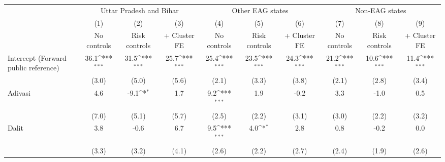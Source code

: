 {
\def\sym#1{\ifmmode^{#1}\else\(^{#1}\)\fi}
\begin{tabular}{l*{9}{c}}
\toprule
            &\multicolumn{3}{c}{Uttar Pradesh and Bihar}                      &\multicolumn{3}{c}{Other EAG states}                             &\multicolumn{3}{c}{Non-EAG states}                               \\\cmidrule(lr){2-4}\cmidrule(lr){5-7}\cmidrule(lr){8-10}
            &\multicolumn{1}{c}{(1)}&\multicolumn{1}{c}{(2)}&\multicolumn{1}{c}{(3)}&\multicolumn{1}{c}{(4)}&\multicolumn{1}{c}{(5)}&\multicolumn{1}{c}{(6)}&\multicolumn{1}{c}{(7)}&\multicolumn{1}{c}{(8)}&\multicolumn{1}{c}{(9)}\\
            &\multicolumn{1}{c}{No controls}&\multicolumn{1}{c}{Risk controls}&\multicolumn{1}{c}{+ Cluster FE}&\multicolumn{1}{c}{No controls}&\multicolumn{1}{c}{Risk controls}&\multicolumn{1}{c}{+ Cluster FE}&\multicolumn{1}{c}{No controls}&\multicolumn{1}{c}{Risk controls}&\multicolumn{1}{c}{+ Cluster FE}\\
\midrule
Intercept (Forward public reference)&        36.1\sym{***}&        31.5\sym{***}&        25.7\sym{***}&        25.4\sym{***}&        23.5\sym{***}&        24.3\sym{***}&        21.2\sym{***}&        10.6\sym{***}&        11.4\sym{***}\\
            &       (3.0)         &       (5.0)         &       (5.6)         &       (2.1)         &       (3.3)         &       (3.8)         &       (2.1)         &       (2.8)         &       (3.4)         \\
\addlinespace
Adivasi     &         4.6         &        -9.1\sym{*}  &         1.7         &         9.2\sym{***}&         1.9         &        -0.2         &         3.3         &        -1.0         &         0.5         \\
            &       (7.0)         &       (5.1)         &       (5.7)         &       (2.5)         &       (2.2)         &       (3.1)         &       (3.0)         &       (2.2)         &       (3.2)         \\
\addlinespace
Dalit       &         3.8         &        -0.6         &         6.7         &         9.5\sym{***}&         4.0\sym{*}  &         2.8         &         0.8         &        -0.2         &         0.0         \\
            &       (3.3)         &       (3.2)         &       (4.1)         &       (2.6)         &       (2.2)         &       (2.7)         &       (2.4)         &       (1.9)         &       (2.6)         \\

\end{tabular}}
